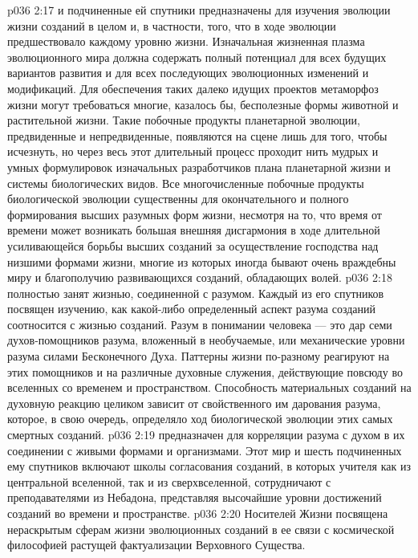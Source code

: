\vs p036 2:17 \pc {} и подчиненные ей спутники предназначены для изучения эволюции жизни созданий в целом и, в частности, того, что в ходе эволюции предшествовало каждому уровню жизни. Изначальная жизненная плазма эволюционного мира должна содержать полный потенциал для всех будущих вариантов развития и для всех последующих эволюционных изменений и модификаций. Для обеспечения таких далеко идущих проектов метаморфоз жизни могут требоваться многие, казалось бы, бесполезные формы животной и растительной жизни. Такие побочные продукты планетарной эволюции, предвиденные и непредвиденные, появляются на сцене лишь для того, чтобы исчезнуть, но через весь этот длительный процесс проходит нить мудрых и умных формулировок изначальных разработчиков плана планетарной жизни и системы биологических видов. Все многочисленные побочные продукты биологической эволюции существенны для окончательного и полного формирования высших разумных форм жизни, несмотря на то, что время от времени может возникать большая внешняя дисгармония в ходе длительной усиливающейся борьбы высших созданий за осуществление господства над низшими формами жизни, многие из которых иногда бывают очень враждебны миру и благополучию развивающихся созданий, обладающих волей.
\vs p036 2:18 \pc {} полностью занят жизнью, соединенной с разумом. Каждый из его спутников посвящен изучению, как какой\hyp{}либо определенный аспект разума созданий соотносится с жизнью созданий. Разум в понимании человека --- это дар семи духов\hyp{}помощников разума, вложенный в необучаемые, или механические уровни разума силами Бесконечного Духа. Паттерны жизни по\hyp{}разному реагируют на этих помощников и на различные духовные служения, действующие повсюду во вселенных со временем и пространством. Способность материальных созданий на духовную реакцию целиком зависит от свойственного им дарования разума, которое, в свою очередь, определяло ход биологической эволюции этих самых смертных созданий.
\vs p036 2:19 \pc {} предназначен для корреляции разума с духом в их соединении с живыми формами и организмами. Этот мир и шесть подчиненных ему спутников включают школы согласования созданий, в которых учителя как из центральной вселенной, так и из сверхвселенной, сотрудничают с преподавателями из Небадона, представляя высочайшие уровни достижений созданий во времени и пространстве.
\vs p036 2:20 \pc {} Носителей Жизни посвящена нераскрытым сферам жизни эволюционных созданий в ее связи с космической философией растущей фактуализации Верховного Существа.

